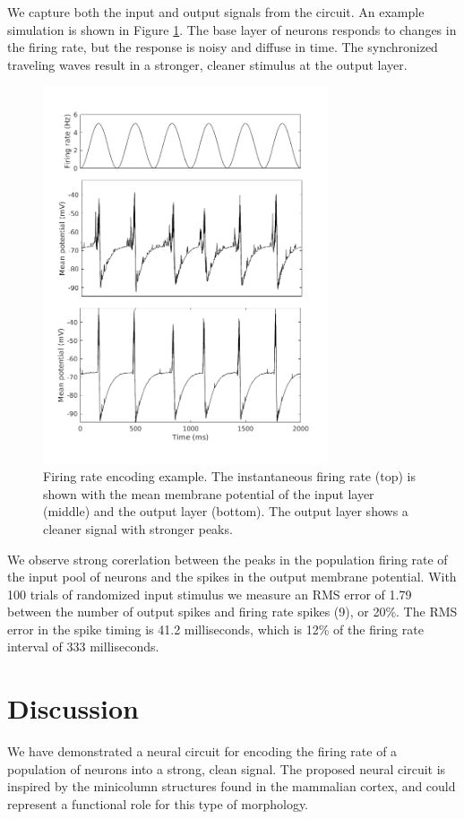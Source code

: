 \documentclass[a4paper,11pt]{article}
\begin{document}
We capture both the input and output signals from the circuit.
An example simulation is shown in Figure \ref{fig:firingrate_example}.
The base layer of neurons responds to changes in the firing rate, but the response is noisy and diffuse in time.
The synchronized traveling waves result in a stronger, cleaner stimulus at the output layer.

\begin{figure}[!ht]
 \caption{Firing rate encoding example. The instantaneous firing rate (top) is shown with the mean membrane potential of the input layer (middle) and the output layer (bottom). The output layer shows a cleaner signal with stronger peaks.}
 \label{fig:firingrate_example}
 \centering
   \includegraphics[width=0.75\textwidth]{fig/FiringRateEncodingExample}
\end{figure}

We observe strong corerlation between the peaks in the population firing rate of the input pool of neurons and the spikes in the output membrane potential.
With 100 trials of randomized input stimulus we measure an RMS error of 1.79 between the number of output spikes and firing rate spikes (9), or 20\%.
The RMS error in the spike timing is 41.2 milliseconds, which is 12\% of the firing rate interval of 333 milliseconds.


\clearpage
\section{Discussion}
We have demonstrated a neural circuit for encoding the firing rate of a population of neurons into a strong, clean signal.
The proposed neural circuit is inspired by the minicolumn structures found in the mammalian cortex, and could represent a functional role for this type of morphology.


\clearpage
\printbibliography
\end{document}
